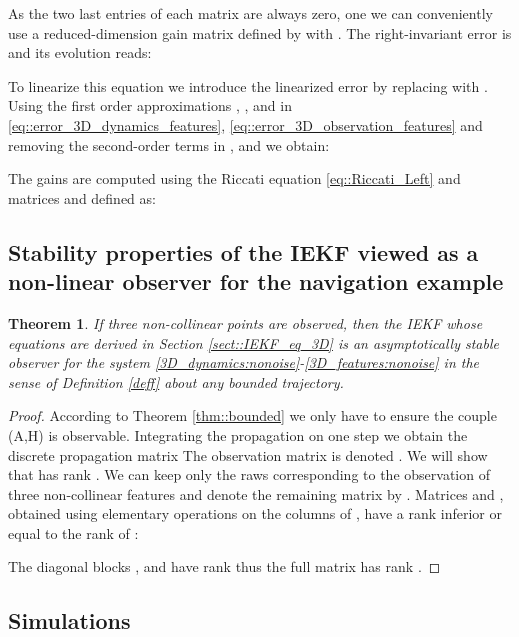 \documentclass[a4paper,12pt,onecolumn]{article}
\newtheorem{thm}{Theorem}
\begin{document}
As the two last entries of each matrix  are always zero, one we can conveniently use a reduced-dimension gain matrix  defined by  with .  
The right-invariant error is 
and its evolution reads:



To linearize this equation we introduce the linearized error  by replacing  with . Using the first order approximations , ,  and  in \eqref{eq::error_3D_dynamics_features}, \eqref{eq::error_3D_observation_features} and removing the second-order terms in ,  and  we obtain:


The gains   are computed using the Riccati equation \eqref{eq::Riccati_Left} and matrices  and  defined as:




\subsection{Stability properties of the IEKF viewed as a non-linear observer for the navigation example}
\begin{thm}
\label{thm::3D_features_stability}
If three non-collinear points are observed, then the  IEKF whose equations are derived in Section \ref{sect::IEKF_eq_3D} is an asymptotically stable observer for the system \eqref{3D_dynamics:nonoise}-\eqref{3D_features:nonoise}   in the sense of Definition \ref{deff} about \emph{any} bounded trajectory.
\end{thm}

\begin{proof}
According to Theorem \ref{thm::bounded} we only have to ensure the couple (A,H) is observable. Integrating the propagation on one step we obtain the discrete propagation matrix  The observation matrix is denoted . We will show that  has rank . We can keep only the raws corresponding to the observation of three non-collinear features  and denote the remaining matrix by . Matrices  and , obtained using elementary operations on the columns of , have a rank inferior or equal to the rank of :

 
The diagonal blocks ,  and  have rank  thus the full matrix has rank .
\end{proof}

\subsection{Simulations}
\end{document}
